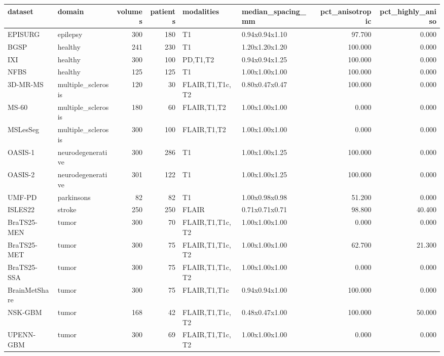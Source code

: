 \begin{tabular}{llrrllrr}
\toprule
dataset & domain & volumes & patients & modalities & median\_spacing\_mm & pct\_anisotropic & pct\_highly\_aniso \\
\midrule
EPISURG & epilepsy & 300 & 180 & T1 & 0.94x0.94x1.10 & 97.700 & 0.000 \\
BGSP & healthy & 241 & 230 & T1 & 1.20x1.20x1.20 & 100.000 & 0.000 \\
IXI & healthy & 300 & 100 & PD,T1,T2 & 0.94x0.94x1.25 & 100.000 & 0.000 \\
NFBS & healthy & 125 & 125 & T1 & 1.00x1.00x1.00 & 100.000 & 0.000 \\
3D-MR-MS & multiple\_sclerosis & 120 & 30 & FLAIR,T1,T1c,T2 & 0.80x0.47x0.47 & 100.000 & 0.000 \\
MS-60 & multiple\_sclerosis & 180 & 60 & FLAIR,T1,T2 & 1.00x1.00x1.00 & 0.000 & 0.000 \\
MSLesSeg & multiple\_sclerosis & 300 & 100 & FLAIR,T1,T2 & 1.00x1.00x1.00 & 0.000 & 0.000 \\
OASIS-1 & neurodegenerative & 300 & 286 & T1 & 1.00x1.00x1.25 & 100.000 & 0.000 \\
OASIS-2 & neurodegenerative & 301 & 122 & T1 & 1.00x1.00x1.25 & 100.000 & 0.000 \\
UMF-PD & parkinsons & 82 & 82 & T1 & 1.00x0.98x0.98 & 51.200 & 0.000 \\
ISLES22 & stroke & 250 & 250 & FLAIR & 0.71x0.71x0.71 & 98.800 & 40.400 \\
BraTS25-MEN & tumor & 300 & 70 & FLAIR,T1,T1c,T2 & 1.00x1.00x1.00 & 0.000 & 0.000 \\
BraTS25-MET & tumor & 300 & 75 & FLAIR,T1,T1c,T2 & 1.00x1.00x1.00 & 62.700 & 21.300 \\
BraTS25-SSA & tumor & 300 & 75 & FLAIR,T1,T1c,T2 & 1.00x1.00x1.00 & 0.000 & 0.000 \\
BrainMetShare & tumor & 300 & 75 & FLAIR,T1,T1c & 0.94x0.94x1.00 & 100.000 & 0.000 \\
NSK-GBM & tumor & 168 & 42 & FLAIR,T1,T1c,T2 & 0.48x0.47x1.00 & 100.000 & 50.000 \\
UPENN-GBM & tumor & 300 & 69 & FLAIR,T1,T1c,T2 & 1.00x1.00x1.00 & 0.000 & 0.000 \\
\bottomrule
\end{tabular}
